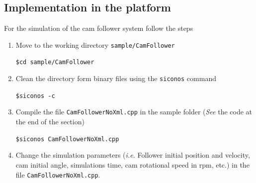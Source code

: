 \subsection{Implementation in the platform}
For the simulation of the cam follower system follow the steps

\begin{enumerate}
\item Move to the working directory \verb"sample/CamFollower"

\verb"$cd sample/CamFollower "

\item Clean the directory form binary files using the
\verb"siconos" command

\verb"$siconos -c "

\item Compile the file \verb"CamFollowerNoXml.cpp" in
the sample folder ({\em See} the code at the end of the section)

\verb"$siconos CamFollowerNoXml.cpp"

\item Change the simulation parameters ({\em i.e.}
Follower initial position and velocity, cam initial angle,
simulations time, cam rotational speed in rpm, etc.) in the file
\verb"CamFollowerNoXml.cpp".

\end{enumerate}

